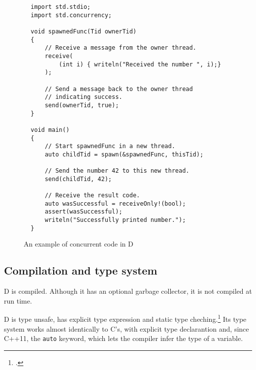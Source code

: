 \begin{figure}
  \caption{An example of concurrent code in D}
  \label{fig:d_concurrency_code_example}
  \begin{lstlisting}
  import std.stdio;
  import std.concurrency;

  void spawnedFunc(Tid ownerTid)
  {
      // Receive a message from the owner thread.
      receive(
          (int i) { writeln("Received the number ", i);}
      );

      // Send a message back to the owner thread
      // indicating success.
      send(ownerTid, true);
  }

  void main()
  {
      // Start spawnedFunc in a new thread.
      auto childTid = spawn(&spawnedFunc, thisTid);

      // Send the number 42 to this new thread.
      send(childTid, 42);

      // Receive the result code.
      auto wasSuccessful = receiveOnly!(bool);
      assert(wasSuccessful);
      writeln("Successfully printed number.");
  }
  \end{lstlisting}
\end{figure}

\subsection{Compilation and type system} \label{subsec:compilation_and_type_system}

D is compiled. Although it has an optional garbage collector, it is not compiled at run time.

D is type unsafe, has explicit type expression and static type cheching.\footcite{comparison_by_type} Its type system works almost identically to C's, with explicit type declarantion and, since C++11, the \texttt{auto} keyword, which lets the compiler infer the type of a variable.
